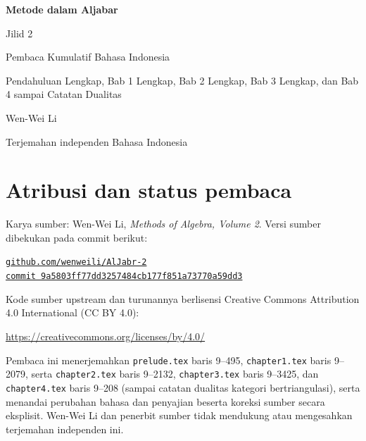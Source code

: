 \documentclass[
  colors=true,
  fontsetup=font-setup-id.tex,
  titlesetup=titles-setup.tex
]{AJbook2}
\theoremstyle{plain}
\theoremstyle{nonumberplain}
\numberwithin{equation}{section}
\numberwithin{figure}{section}
\begin{document}
\begin{titlepage}
  \centering
  \vspace*{0.16\textheight}
  {\Huge\bfseries Metode dalam Aljabar\par}
  \vspace{0.8em}
  {\LARGE Jilid 2\par}
  \vspace{1.8em}
  {\Large Pembaca Kumulatif Bahasa Indonesia\par}
  \vspace{0.6em}
  {\large Pendahuluan Lengkap, Bab 1 Lengkap, Bab 2 Lengkap, Bab 3 Lengkap, dan Bab 4 sampai Catatan Dualitas\par}
  \vfill
  {\Large Wen-Wei Li\par}
  \vspace{0.6em}
  {\normalsize Terjemahan independen Bahasa Indonesia\par}
  \vspace*{0.10\textheight}
\end{titlepage}

\cleardoublepage
\thispagestyle{empty}
\section*{Atribusi dan status pembaca}
Karya sumber: Wen-Wei Li, \emph{Methods of Algebra, Volume 2}. Versi
sumber dibekukan pada commit berikut:
\begin{center}
  \small
  \href{https://github.com/wenweili/AlJabr-2}{\texttt{github.com/wenweili/AlJabr-2}}\\
  \href{https://github.com/wenweili/AlJabr-2/commit/9a5803ff77dd3257484cb177f851a73770a59dd3}{\texttt{commit 9a5803ff77dd3257484cb177f851a73770a59dd3}}
\end{center}
Kode sumber upstream dan turunannya berlisensi Creative Commons
Attribution 4.0 International (CC BY 4.0):
\begin{center}
  \small\url{https://creativecommons.org/licenses/by/4.0/}
\end{center}
Pembaca ini menerjemahkan
\texttt{prelude.tex} baris 9--495, \texttt{chapter1.tex} baris 9--2079,
serta \texttt{chapter2.tex} baris 9--2132, \texttt{chapter3.tex} baris
9--3425, dan \texttt{chapter4.tex} baris 9--208 (sampai catatan dualitas
kategori bertriangulasi), serta menandai
perubahan bahasa dan penyajian beserta koreksi sumber secara eksplisit.
Wen-Wei Li dan penerbit sumber tidak mendukung atau mengesahkan terjemahan
independen ini.
\end{document}
